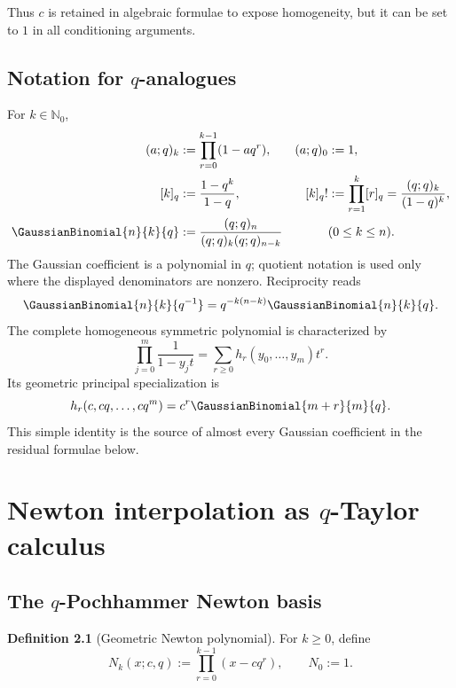 \documentclass[11pt,oneside]{book}
\numberwithin{equation}{chapter}
\theoremstyle{definition}
\newtheorem{definition}[theorem]{Definition}
\theoremstyle{remark}
\newcommand{\Nzero}{\mathbb N_0}
\begin{document}
Thus $c$ is retained in algebraic formulae to expose homogeneity, but it can
be set to $1$ in all conditioning arguments.

\section{Notation for \texorpdfstring{$q$}{q}-analogues}

For $k\in\Nzero$,
\begin{align}
 (a;q)_k&:=\prod_{r=0}^{k-1}(1-aq^r),
 & (a;q)_0&:=1,\\
 [k]_q&:=\frac{1-q^k}{1-q},
 & [k]_q!&:=\prod_{r=1}^k[r]_q=\frac{(q;q)_k}{(1-q)^k},\\
 \GaussianBinomial{n}{k}{q}&:=\frac{(q;q)_n}{(q;q)_k(q;q)_{n-k}}
 &&(0\le k\le n).
\end{align}
The Gaussian coefficient is a polynomial in $q$; quotient notation is used
only where the displayed denominators are nonzero.  Reciprocity reads
\begin{equation}
 \GaussianBinomial{n}{k}{q^{-1}}=q^{-k(n-k)}\GaussianBinomial{n}{k}{q}.
 \label{eq:q-reciprocity}
\end{equation}
The complete homogeneous symmetric polynomial is characterized by
\begin{equation}
 \prod_{j=0}^m\frac1{1-y_jt}
 =\sum_{r\ge0}h_r(y_0,\ldots,y_m)t^r.
 \label{eq:h-generating}
\end{equation}
Its geometric principal specialization is
\begin{equation}
 h_r(c,cq,\ldots,cq^m)=c^r\GaussianBinomial{m+r}{m}{q}.
 \label{eq:h-principal}
\end{equation}
This simple identity is the source of almost every Gaussian coefficient in
the residual formulae below.

\chapter{Newton interpolation as \texorpdfstring{$q$}{q}-Taylor calculus}
\label{chap:q-newton}

\section{The \texorpdfstring{$q$}{q}-Pochhammer Newton basis}

\begin{definition}[Geometric Newton polynomial]
For $k\ge0$, define
\begin{equation}
 N_k(x;c,q):=\prod_{r=0}^{k-1}(x-cq^r),
 \qquad N_0:=1.
 \label{eq:newton-basis}
\end{equation}
\end{definition}
\end{document}
